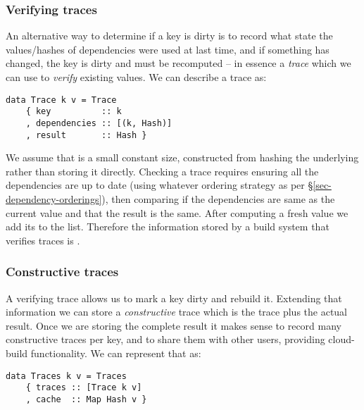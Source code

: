 \subsubsection{Verifying traces}\label{sec-verifying-traces}

An alternative way to determine if a key is dirty is to record what state the
values/hashes of dependencies were used at last time, and if something has
changed, the key is dirty and must be recomputed -- in essence a \emph{trace}
which we can use to \textit{verify} existing values. We can describe a trace as:


\begin{verbatim}
data Trace k v = Trace
    { key          :: k
    , dependencies :: [(k, Hash)]
    , result       :: Hash }
\end{verbatim}

We assume that  is a small constant size, constructed from hashing the
underlying  rather than storing it directly. Checking a trace requires
ensuring all the dependencies are up to date (using whatever ordering strategy
as per \S\ref{sec-dependency-orderings}), then comparing if the dependencies are
same as the current value and that the result is the same. After computing a
fresh value we add its  to the list. Therefore the information stored
by a build system that verifies traces is \hs{[Trace k v]}.

\subsubsection{Constructive traces}\label{sec-constructive-traces}

A verifying trace allows us to mark a key dirty and rebuild it. Extending that information we can store a \textit{constructive} trace which is the trace plus the actual result. Once we are storing the complete result it makes sense to record many constructive traces per key, and to share them with other users, providing cloud-build functionality. We can represent that as:


\begin{verbatim}
data Traces k v = Traces
    { traces :: [Trace k v]
    , cache  :: Map Hash v }
\end{verbatim}

